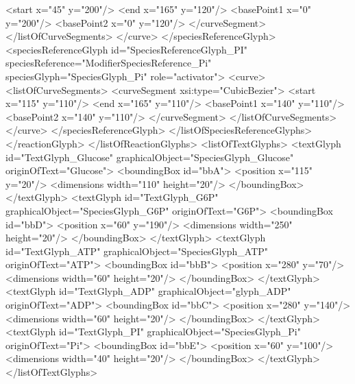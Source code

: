 \begin{example}
                      <start x="45" y="200"/>
                      <end x="165" y="120"/>
                      <basePoint1 x="0" y="200"/>
                      <basePoint2 x="0" y="120"/>
                    </curveSegment>
                  </listOfCurveSegments>
                </curve>
              </speciesReferenceGlyph>
              <speciesReferenceGlyph id="SpeciesReferenceGlyph_PI"
                    speciesReference="ModifierSpeciesReference_Pi"
                    speciesGlyph="SpeciesGlyph_Pi" role="activator">
                <curve>
                  <listOfCurveSegments>
                    <curveSegment xsi:type="CubicBezier">
                      <start x="115" y="110"/>
                      <end x="165" y="110"/>
                      <basePoint1 x="140" y="110"/>
                      <basePoint2 x="140" y="110"/>
                    </curveSegment>
                  </listOfCurveSegments>
                </curve>
              </speciesReferenceGlyph>
            </listOfSpeciesReferenceGlyphs>
          </reactionGlyph>
        </listOfReactionGlyphs>
        <listOfTextGlyphs>
          <textGlyph id="TextGlyph_Glucose" graphicalObject="SpeciesGlyph_Glucose"
                     originOfText="Glucose">
            <boundingBox id="bbA">
              <position x="115" y="20"/>
              <dimensions width="110" height="20"/>
            </boundingBox>
          </textGlyph>
          <textGlyph id="TextGlyph_G6P" graphicalObject="SpeciesGlyph_G6P" 
                     originOfText="G6P">
            <boundingBox id="bbD">
              <position x="60" y="190"/>
              <dimensions width="250" height="20"/>
            </boundingBox>
          </textGlyph>
          <textGlyph id="TextGlyph_ATP" graphicalObject="SpeciesGlyph_ATP"
                     originOfText="ATP">
            <boundingBox id="bbB">
              <position x="280" y="70"/>
              <dimensions width="60" height="20"/>
            </boundingBox>
          </textGlyph>
          <textGlyph id="TextGlyph_ADP" graphicalObject="glyph_ADP"
                     originOfText="ADP">
            <boundingBox id="bbC">
              <position x="280" y="140"/>
              <dimensions width="60" height="20"/>
            </boundingBox>
          </textGlyph>
          <textGlyph id="TextGlyph_PI" graphicalObject="SpeciesGlyph_Pi"
                     originOfText="Pi">
            <boundingBox id="bbE">
              <position x="60" y="100"/>
              <dimensions width="40" height="20"/>
            </boundingBox>
          </textGlyph>
        </listOfTextGlyphs>

\end{example}
